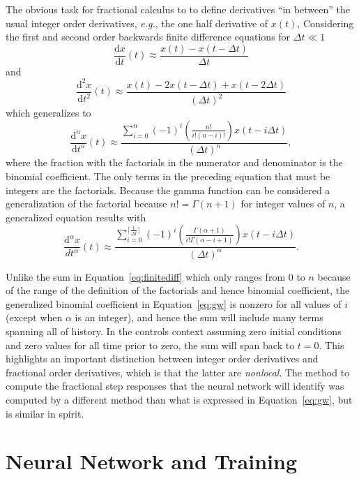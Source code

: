 \documentclass[letterpaper, 10 pt, conference]{ieeeconf}  %
\renewcommand{\d}{\mathrm{d}}
\begin{document}
  The obvious task for fractional calculus to to define derivatives ``in
  between'' the usual integer order derivatives, \textit{e.g.}, the one half
  derivative of $x(t)$, Considering the first and second order backwards finite
  difference equations for $\Delta t \ll 1$
 \[
 \frac{\d x}{\d t}\left(t\right) \approx \frac{x(t) - x \left(t - \Delta
 t\right)}{\Delta t}
 \]
 and
 \[
    \frac{\d^2 x}{\d t^2}\left(t\right) \approx \frac{x(t) - 2 x \left(t - \Delta
    t\right) + x(t - 2 \Delta t)}{\left( \Delta t \right)^2}
 \]
 which generalizes to
 \begin{equation}
  \frac{\d^n x}{\d t^n}(t) \approx \frac{\sum_{i=0}^n \left( -1 \right)^i
  \left( \frac{n!}{i! \left( n - i \right)!} \right) x ( t - i \Delta t )}{\left( \Delta t
  \right)^n},
  \label{eq:finitediff}
 \end{equation}
 where the fraction with the factorials in the numerator and denominator is the
 binomial coefficient. 
 The only terms in the preceding equation that must be integers are the
 factorials. Because the gamma function can be considered a generalization of
 the factorial because $n! = \Gamma(n+1)$ for integer values of $n$, a
 generalized equation results with
 \begin{equation}
    \frac{\d^\alpha x}{d t^\alpha}(t) \approx \frac{\sum_{i=0}^{\lceil
    \frac{t}{\Delta t} \rceil} \left( -1 \right)^i \left(
    \frac{\Gamma(\alpha+1)}{i! \Gamma\left( \alpha - i + 1\right)} \right) x ( t
    - i \Delta t )}{\left( \Delta t \right)^\alpha}.
    \label{eq:gw}
 \end{equation}
  
  Unlike the sum in Equation~\ref{eq:finitediff} which only ranges from $0$ to
  $n$ because of the range of the definition of the factorials and hence
  binomial coefficient, the generalized binomial coefficient in
  Equation~\ref{eq:gw} is nonzero for all values of $i$ (except when $\alpha$ is
  an integer), and hence the sum will include many terms spanning all of
  history. In the controls context assuming zero initial conditions and zero
  values for all time prior to zero, the sum will span back to $t=0$. This
  highlights an important distinction between integer order derivatives and
  fractional order derivatives, which is that the latter are \emph{nonlocal}.
  The method to compute the fractional step responses that the neural network
  will identify was computed by a different method than what is expressed in
  Equation~\ref{eq:gw}, but is similar in spirit.
  
  \section{Neural Network and Training}
\end{document}
